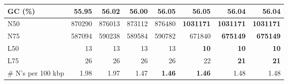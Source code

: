 \documentclass[12pt,a4paper]{article}
\begin{document}
\begin{table}[ht]
\begin{center}
\begin{tabular}{|l*{7}{|r}|}
GC (\%) & 55.95 & 56.02 & 56.00 & 56.05 & 56.05 & 56.04 & 56.04 \\ \hline
N50 & 870290 & 876013 & 873112 & 876480 & {\bf 1031171} & {\bf 1031171} & {\bf 1031171} \\ \hline
N75 & 587094 & 590238 & 589584 & 590782 & 671840 & {\bf 675149} & {\bf 675149} \\ \hline
L50 & 13 & 13 & 13 & 13 & {\bf 10} & {\bf 10} & {\bf 10} \\ \hline
L75 & 26 & 26 & 26 & 26 & 22 & {\bf 21} & {\bf 21} \\ \hline
\# N's per 100 kbp & 1.98 & 1.97 & 1.47 & {\bf 1.46} & {\bf 1.46} & 1.48 & 1.48 \\ \hline
\end{tabular}
\end{center}
\end{table}
\end{document}
